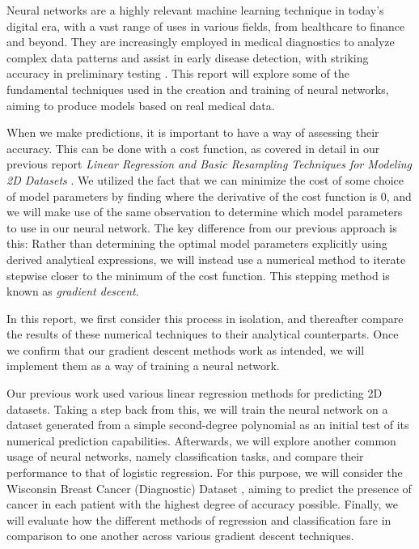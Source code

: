 
Neural networks are a highly relevant machine learning technique in today's digital era, with a vast range of uses in various fields, from healthcare to finance and beyond. They are increasingly employed in medical diagnostics to analyze complex data patterns and assist in early disease detection, with striking accuracy in preliminary testing \cite{ZELTZER2023480}. This report will explore some of the fundamental techniques used in the creation and training of neural networks, aiming to produce models based on real medical data.

When we make predictions, it is important to have a way of assessing their accuracy. This can be done with a cost function, as covered in detail in our previous report \emph{Linear Regression and Basic Resampling Techniques for Modeling 2D Datasets} \cite{fysstkproject1}. We utilized the fact that we can minimize the cost of some choice of model parameters by finding where the derivative of the cost function is 0, and we will make use of the same observation to determine which model parameters to use in our neural network. The key difference from our previous approach is this: Rather than determining the optimal model parameters explicitly using derived analytical expressions, we will instead use a numerical method to iterate stepwise closer to the minimum of the cost function. This stepping method is known as \emph{gradient descent}. 

In this report, we first consider this process in isolation, and thereafter compare the results of these numerical techniques to their analytical counterparts. Once we confirm that our gradient descent methods work as intended, we will implement them as a way of training a neural network.

Our previous work used various linear regression methods for predicting 2D datasets. Taking a step back from this, we will train the neural network on a dataset generated from a simple second-degree polynomial as an initial test of its numerical prediction capabilities. Afterwards, we will explore another common usage of neural networks, namely classification tasks, and compare their performance to that of logistic regression. For this purpose, we will consider the Wisconsin Breast Cancer (Diagnostic) Dataset \cite{sklearnBreastCancerData}, aiming to predict the presence of cancer in each patient with the highest degree of accuracy possible. Finally, we will evaluate how the different methods of regression and classification fare in comparison to one another across various gradient descent techniques.

